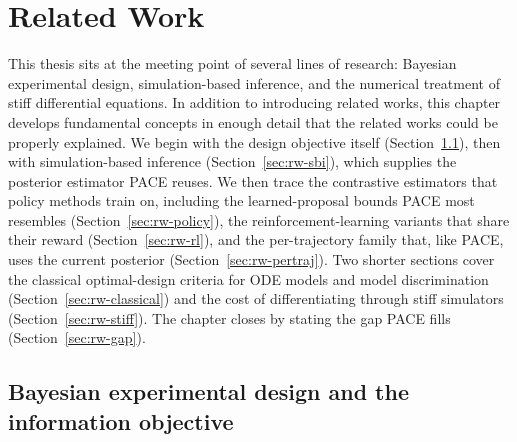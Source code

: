 \chapter{Related Work}
\label{sec:related_work}

This thesis sits at the meeting point of several lines of research: Bayesian experimental design, simulation-based inference, and the numerical treatment
of stiff differential equations. In addition to introducing related works, this chapter develops fundamental concepts in enough detail that the related works could be properly explained. We begin with the design objective itself
(Section~\ref{sec:rw-bed}), then with simulation-based inference
(Section~\ref{sec:rw-sbi}), which supplies the posterior estimator PACE reuses. We then trace the contrastive
estimators that policy methods train on, including the learned-proposal bounds PACE most
resembles (Section~\ref{sec:rw-policy}), the reinforcement-learning variants that share
their reward (Section~\ref{sec:rw-rl}), and the per-trajectory family that, like PACE,
uses the current posterior (Section~\ref{sec:rw-pertraj}). Two shorter sections cover the classical optimal-design criteria for ODE models and
model discrimination (Section~\ref{sec:rw-classical}) and the cost of differentiating
through stiff simulators
(Section~\ref{sec:rw-stiff}). The chapter closes by stating the gap PACE fills
(Section~\ref{sec:rw-gap}).

\section{Bayesian experimental design and the information objective}
\label{sec:rw-bed}

